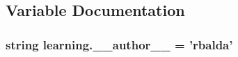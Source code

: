 \subsection{Variable Documentation}
\hypertarget{namespacelearning_a551056cbe1aa3ac5fbe3b4cbd2f013ea}{
\subsubsection[{\-\_\-\-\_\-author\-\_\-\-\_\-}]{\setlength{\rightskip}{0pt plus 5cm}string learning.\-\_\-\-\_\-author\-\_\-\-\_\- = 'rbalda'}}\label{namespacelearning_a551056cbe1aa3ac5fbe3b4cbd2f013ea}
